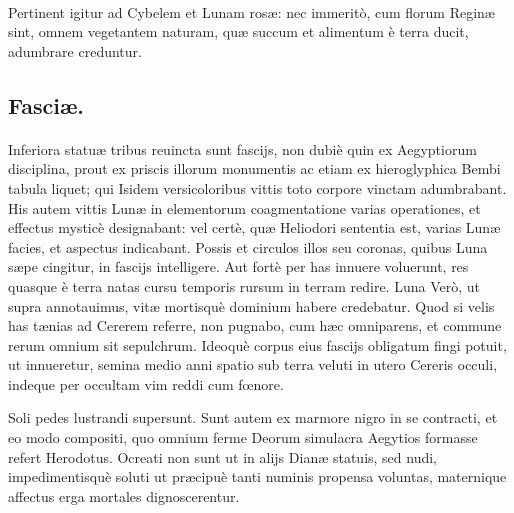 \documentclass[a4paper, 11pt, oneside, polutonikogreek, latin]{article}
\begin{document}
\paragraph{}
Pertinent igitur ad Cybelem et Lunam rosæ: nec immeritò, cum florum Reginæ sint, omnem vegetantem naturam, quæ succum et alimentum è terra ducit, adumbrare creduntur.
\clearpage
\subsection{Fasciæ.}
\paragraph{}
Inferiora statuæ tribus reuincta sunt fascijs, non dubiè quin ex Aegyptiorum disciplina, prout ex priscis illorum monumentis ac etiam ex hieroglyphica Bembi tabula liquet; qui Isidem versicoloribus vittis toto corpore vinctam adumbrabant. His autem vittis Lunæ in elementorum coagmentatione varias operationes, et effectus mysticè designabant: vel certè, quæ Heliodori sententia est, varias Lunæ facies, et aspectus indicabant. Possis et circulos illos seu coronas, quibus Luna sæpe cingitur, in fascijs intelligere. Aut fortè per has innuere voluerunt, res quasque è terra natas cursu temporis rursum in terram redire. Luna Verò, ut supra annotauimus, vitæ mortisquè dominium habere credebatur. Quod si velis has tænias ad Cererem referre, non pugnabo, cum hæc omniparens, et commune rerum omnium sit sepulchrum. Ideoquè corpus eius fascijs obligatum fingi potuit, ut innueretur, semina medio anni spatio sub terra veluti in utero Cereris occuli, indeque per occultam vim reddi cum fœnore.

Soli pedes lustrandi supersunt. Sunt autem ex marmore nigro in se contracti, et eo modo compositi, quo omnium ferme Deorum simulacra Aegytios formasse refert Herodotus. Ocreati non sunt ut in alijs Dianæ statuis, sed nudi, impedimentisquè soluti ut præcipuè tanti numinis propensa voluntas, maternique affectus erga mortales dignoscerentur.
\end{document}

